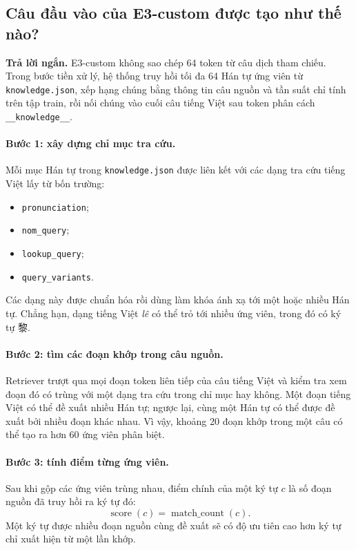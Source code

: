 \documentclass[11pt]{article}
\newcommand{\quickanswer}[1]{%
  \par\medskip
  \noindent\colorbox{qasoft}{%
    \parbox{\dimexpr\linewidth-2\fboxsep\relax}{%
      \textcolor{qaaccent}{\textbf{Trả lời ngắn.}} #1}}
  \par\medskip
}
\begin{document}
\subsection{Câu đầu vào của E3-custom được tạo như thế nào?}

\quickanswer{E3-custom không sao chép 64 token từ câu dịch tham chiếu. Trong
bước tiền xử lý, hệ thống truy hồi tối đa 64 Hán tự ứng viên từ
\texttt{knowledge.json}, xếp hạng chúng bằng thông tin câu nguồn và tần suất
chỉ tính trên tập train, rồi nối chúng vào cuối câu tiếng Việt sau token phân
cách \texttt{\_\_knowledge\_\_}.}

\paragraph{Bước 1: xây dựng chỉ mục tra cứu.}
Mỗi mục Hán tự trong \texttt{knowledge.json} được liên kết với các dạng tra
cứu tiếng Việt lấy từ bốn trường:
\begin{itemize}
  \item \texttt{pronunciation};
  \item \texttt{nom\_query};
  \item \texttt{lookup\_query};
  \item \texttt{query\_variants}.
\end{itemize}
Các dạng này được chuẩn hóa rồi dùng làm khóa ánh xạ tới một hoặc nhiều Hán
tự. Chẳng hạn, dạng tiếng Việt \emph{lê} có thể trỏ tới nhiều ứng viên, trong
đó có ký tự 黎.

\paragraph{Bước 2: tìm các đoạn khớp trong câu nguồn.}
Retriever trượt qua mọi đoạn token liên tiếp của câu tiếng Việt và kiểm tra
xem đoạn đó có trùng với một dạng tra cứu trong chỉ mục hay không. Một đoạn
tiếng Việt có thể đề xuất nhiều Hán tự; ngược lại, cùng một Hán tự có thể được
đề xuất bởi nhiều đoạn khác nhau. Vì vậy, khoảng 20 đoạn khớp trong một câu có
thể tạo ra hơn 60 ứng viên phân biệt.

\paragraph{Bước 3: tính điểm từng ứng viên.}
Sau khi gộp các ứng viên trùng nhau, điểm chính của một ký tự $c$ là số đoạn
nguồn đã truy hồi ra ký tự đó:
\begin{equation}
  \operatorname{score}(c)
  =\operatorname{match\_count}(c).
\end{equation}
Một ký tự được nhiều đoạn nguồn cùng đề xuất sẽ có độ ưu tiên cao hơn ký tự
chỉ xuất hiện từ một lần khớp.
\end{document}
